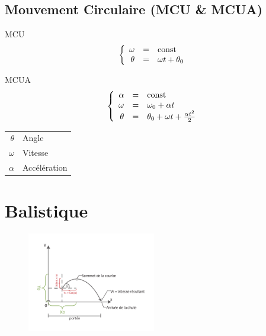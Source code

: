 \documentclass[12pt,a4paper]{article} %
\newcommand\const{\mathrm{const}}
\begin{document}
\subsection*{Mouvement Circulaire (MCU \& MCUA)}
\begin{twocols}[0.7][0.2]
	MCU
	\begin{equation*}
	\left\{
		\begin{array}{rcl}
			\formula{\omega}{\const} \\
			\formula{\theta}{\omega t + \theta_0} \\
		\end{array}
	\right.
	\end{equation*}
	\par\vspace{1em}
	MCUA
	\begin{equation*}
	\left\{
		\begin{array}{rcl}
			\formula{\alpha}{\const} \\
			\formula{\omega}{\omega_0 + \alpha t} \\
			\formula{\theta}{\theta_0 + \omega t + \frac{\alpha t^2}{2}} \\
		\end{array}
	\right.
	\end{equation*}

\nextcol


	\begin{tabular}{rl}
		$\theta$ & Angle \\
		$\omega$ & Vitesse \\
		$\alpha$ & Accélération \\
	\end{tabular}

\end{twocols}

\newpage

\section{Balistique}
\begin{figure}
	\centering
	\includegraphics[width=0.5\textwidth]{images/Balistique}	
\end{figure}
\end{document}
